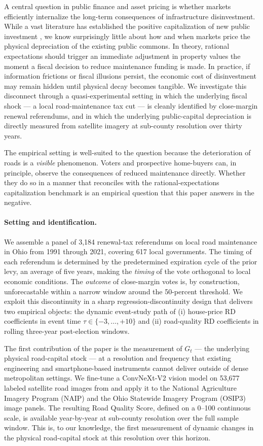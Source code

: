 A central question in public finance and asset pricing is whether markets efficiently internalize the long-term consequences of infrastructure disinvestment. While a vast literature has established the positive capitalization of new public investment \citep{Oates1969, cellini2010value}, we know surprisingly little about how and when markets price the physical depreciation of the existing public commons. In theory, rational expectations should trigger an immediate adjustment in property values the moment a fiscal decision to reduce maintenance funding is made. In practice, if information frictions or fiscal illusions persist, the economic cost of disinvestment may remain hidden until physical decay becomes tangible. We investigate this disconnect through a quasi-experimental setting in which the underlying fiscal shock --- a local road-maintenance tax cut --- is cleanly identified by close-margin renewal referendums, and in which the underlying public-capital depreciation is directly measured from satellite imagery at sub-county resolution over thirty years.

The empirical setting is well-suited to the question because the deterioration of roads is a {\it visible} phenomenon. Voters and prospective home-buyers can, in principle, observe the consequences of reduced maintenance directly. Whether they do so in a manner that reconciles with the rational-expectations capitalization benchmark is an empirical question that this paper answers in the negative.

\paragraph{Setting and identification.}
We assemble a panel of 3,184 renewal-tax referendums on local road maintenance in Ohio from 1991 through 2021, covering 617 local governments. The timing of each referendum is determined by the predetermined expiration cycle of the prior levy, an average of five years, making the {\it timing} of the vote orthogonal to local economic conditions. The {\it outcome} of close-margin votes is, by construction, unforecastable within a narrow window around the 50-percent threshold. We exploit this discontinuity in a sharp regression-discontinuity design that delivers two empirical objects: the dynamic event-study path of (i) house-price RD coefficients in event time $\tau \in \{-3, \dots, +10\}$ and (ii) road-quality RD coefficients in rolling three-year post-election windows.

The first contribution of the paper is the measurement of $G_t$ --- the underlying physical road-capital stock --- at a resolution and frequency that existing engineering and smartphone-based instruments cannot deliver outside of dense metropolitan settings. We fine-tune a ConvNeXt-V2 vision model on 53,677 labeled satellite road images from \cite{brewer2021} and apply it to the National Agriculture Imagery Program (NAIP) and the Ohio Statewide Imagery Program (OSIP3) image panels. The resulting Road Quality Score, defined on a 0--100 continuous scale, is available year-by-year at sub-county resolution over the full sample window. This is, to our knowledge, the first measurement of dynamic changes in the physical road-capital stock at this resolution over this horizon.


